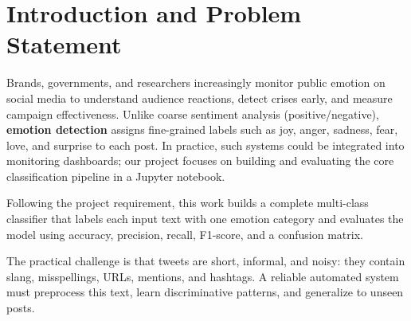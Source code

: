 \documentclass[12pt]{article}
\begin{document}
\tableofcontents
\newpage

\begin{abstract}
Social-media platforms generate vast volumes of short text that reflect how people feel about products, events, and public issues.
This project addresses the need to automatically detect emotions---such as joy, anger, sadness, fear, love, and surprise---from short social-media text.
Such capability could support applications such as brand monitoring and public-opinion analysis; however, our implementation is an offline notebook-based classifier rather than a deployed real-time system.
We built a multi-class text classifier using the \textit{Emotion} dataset from Hugging Face, applying text cleaning, TF-IDF feature extraction, and Logistic Regression with hyperparameter tuning via stratified cross-validation.
On the held-out test set of 2{,}000 tweets, the best model achieved \textbf{90.25\% accuracy} and a \textbf{weighted F1-score of 0.9043}, substantially outperforming a majority-class baseline (34.75\% accuracy).
The strongest performance was observed for \textit{sadness} and \textit{joy}, while semantically similar or minority classes such as \textit{love} and \textit{surprise} were more challenging.
\end{abstract}

\section{Introduction and Problem Statement}

Brands, governments, and researchers increasingly monitor public emotion on social media to understand audience reactions, detect crises early, and measure campaign effectiveness.
Unlike coarse sentiment analysis (positive/negative), \textbf{emotion detection} assigns fine-grained labels such as joy, anger, sadness, fear, love, and surprise to each post.
In practice, such systems could be integrated into monitoring dashboards; our project focuses on building and evaluating the core classification pipeline in a Jupyter notebook.

Following the project requirement, this work builds a complete multi-class classifier that labels each input text with one emotion category and evaluates the model using accuracy, precision, recall, F1-score, and a confusion matrix.

The practical challenge is that tweets are short, informal, and noisy: they contain slang, misspellings, URLs, mentions, and hashtags.
A reliable automated system must preprocess this text, learn discriminative patterns, and generalize to unseen posts.
\end{document}

